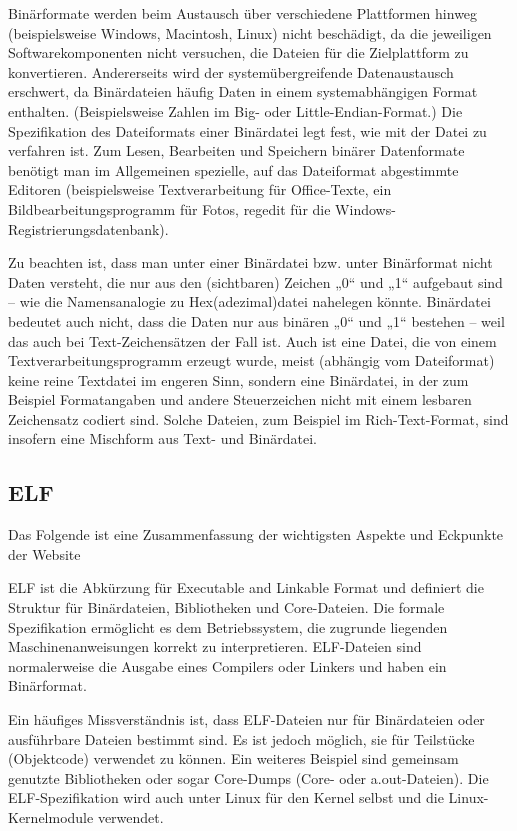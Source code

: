 Binärformate werden beim Austausch über verschiedene Plattformen hinweg (beispielsweise Windows, Macintosh, Linux) nicht beschädigt, da die jeweiligen Softwarekomponenten nicht versuchen, die Dateien für die Zielplattform zu konvertieren. Andererseits wird der systemübergreifende Datenaustausch erschwert, da Binärdateien häufig Daten in einem systemabhängigen Format enthalten. (Beispielsweise Zahlen im Big- oder Little-Endian-Format.) Die Spezifikation des Dateiformats einer Binärdatei legt fest, wie mit der Datei zu verfahren ist. Zum Lesen, Bearbeiten und Speichern binärer Datenformate benötigt man im Allgemeinen spezielle, auf das Dateiformat abgestimmte Editoren (beispielsweise Textverarbeitung für Office-Texte, ein Bildbearbeitungsprogramm für Fotos, regedit für die Windows-Registrierungsdatenbank).

Zu beachten ist, dass man unter einer Binärdatei bzw. unter Binärformat nicht Daten versteht, die nur aus den (sichtbaren) Zeichen „0“ und „1“ aufgebaut sind – wie die Namensanalogie zu Hex(adezimal)datei nahelegen könnte. Binärdatei bedeutet auch nicht, dass die Daten nur aus binären „0“ und „1“ bestehen – weil das auch bei Text-Zeichensätzen der Fall ist. Auch ist eine Datei, die von einem Textverarbeitungsprogramm erzeugt wurde, meist (abhängig vom Dateiformat) keine reine Textdatei im engeren Sinn, sondern eine Binärdatei, in der zum Beispiel Formatangaben und andere Steuerzeichen nicht mit einem lesbaren Zeichensatz codiert sind. Solche Dateien, zum Beispiel im Rich-Text-Format, sind insofern eine Mischform aus Text- und Binärdatei.\cite{bin_wikipedia}

\subsection{ELF}

Das Folgende ist eine Zusammenfassung der wichtigsten Aspekte und Eckpunkte der Website \cite{elf_linux_audit}

ELF ist die Abkürzung für Executable and Linkable Format und definiert die Struktur für Binärdateien, Bibliotheken und Core-Dateien. Die formale Spezifikation ermöglicht es dem Betriebssystem, die zugrunde liegenden Maschinenanweisungen korrekt zu interpretieren. ELF-Dateien sind normalerweise die Ausgabe eines Compilers oder Linkers und haben ein Binärformat.

Ein häufiges Missverständnis ist, dass ELF-Dateien nur für Binärdateien oder ausführbare Dateien bestimmt sind. Es ist jedoch möglich, sie für Teilstücke (Objektcode) verwendet zu können. Ein weiteres Beispiel sind gemeinsam genutzte Bibliotheken oder sogar Core-Dumps (Core- oder a.out-Dateien). Die ELF-Spezifikation wird auch unter Linux für den Kernel selbst und die Linux-Kernelmodule verwendet.


